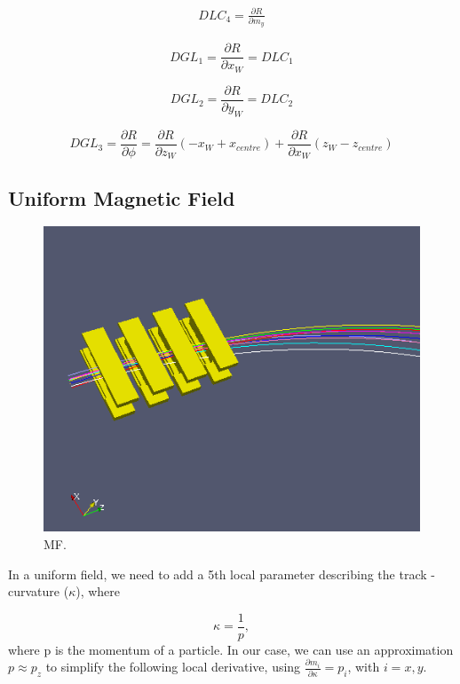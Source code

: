 \documentclass[a4paper,11pt]{article}
\begin{document}
\begin{equation}
\begin{split}
DLC_4 = \frac{ \partial R}{\partial m_y}
\end{split}
\end{equation}


\begin{equation}
DGL_1 = \frac{\partial R}{\partial x_W} = DLC_1
\end{equation}

\begin{equation}
DGL_2 = \frac{\partial R}{\partial y_W} = DLC_2
\end{equation}


\begin{equation}
DGL_3 = \frac{\partial R}{\partial \phi} = \frac{ \partial R}{\partial z_W} (-x_W + x_{centre}) + \frac{ \partial R}{\partial x_W} (z_W - z_{centre}) 
\end{equation}

\subsection{Uniform Magnetic Field}

\begin{figure}[!ht]
\centering
\includegraphics[width=0.5\linewidth]{fig/G4.png}
\caption{MF.}
\label{fig:AlignPath}
\end{figure}

In a uniform field, we need to add a 5th local parameter describing the track - curvature ($\kappa$), where 

\begin{equation}
\kappa = \frac{1}{p},
\end{equation}
where p is the momentum of a particle. In our case, we can use an approximation $p \approx p_z$ to simplify the following local derivative, using $\frac{ \partial m_i}{\partial \kappa} = p_i$, with $i=x,y$.
\end{document}
